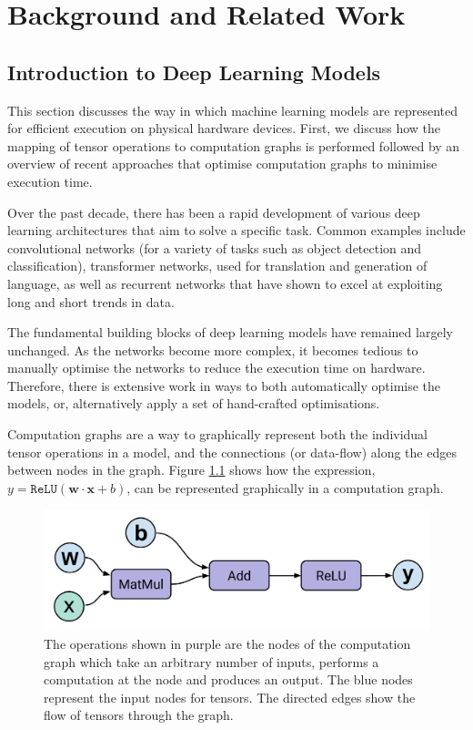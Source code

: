 \chapter{Background and Related Work}

\section{Introduction to Deep Learning Models}
This section discusses the way in which machine learning models are represented for efficient execution on physical hardware devices. First, we discuss how the mapping of tensor operations to computation graphs is performed followed by an overview of recent approaches that optimise computation graphs to minimise execution time.

Over the past decade, there has been a rapid development of various deep learning architectures that aim to solve a specific task. Common examples include convolutional networks (for a variety of tasks such as object detection and classification), transformer networks, used for translation and generation of language, as well as recurrent networks that have shown to excel at exploiting long and short trends in data.

The fundamental building blocks of deep learning models have remained largely unchanged.  As the networks become more complex, it becomes tedious to manually optimise the networks to reduce the execution time on hardware. Therefore, there is extensive work in ways to both automatically optimise the models, or, alternatively apply a set of hand-crafted optimisations.

Computation graphs are a way to graphically represent both the individual tensor operations in a model, and the connections (or data-flow) along the edges between nodes in the graph. Figure \ref{fig:bg:perceptron} shows how the expression, $y = \texttt{ReLU}(\mathbf{w} \cdot \mathbf{x} + b)$, can be represented graphically in a computation graph.

\begin{figure}[ht]
  \centering
  \includegraphics[width=0.75\columnwidth]{sections/2background/images/dataflow}
  \caption[Single perceptron as a computation graph]{The operations shown in purple are the nodes of the computation graph which take an arbitrary number of inputs, performs a computation at the node and produces an output. The blue nodes represent the input nodes for tensors. The directed edges show the flow of tensors through the graph.}
  \label{fig:bg:perceptron}
\end{figure}

